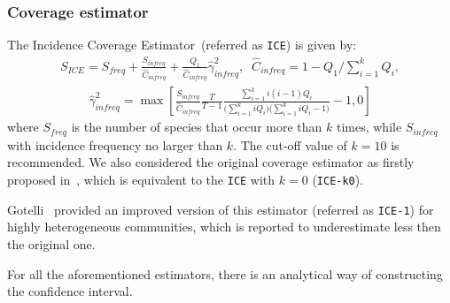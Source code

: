 \documentclass[sigconf,review,anonymous]{acmart}
\newcommand{\ICEallrare}{ICE-k0\xspace}
\newcounter{todocounter}
\newcommand{\todo}[1]{\marginpar{$|$}\textcolor{red}{\stepcounter{todocounter}\footnote[\thetodocounter]{\textcolor{red}{\textbf{TODO }}\textit{#1}}}}
\def\<#1>{\texttt{#1}}
\renewcommand{\todo}[1]{}
\begin{document}
\subsubsection{Coverage estimator~\cite{chao1992estimating}} %
The Incidence Coverage Estimator~(referred as \<ICE>) %
is given by:
\begin{gather*}
  S_{\textit{ICE}} = S_{\textit{freq}} + \frac{S_{\textit{infreq}}}{\hat{C}_{\textit{infreq}}}
  + \frac{Q_1}{\hat{C}_{\textit{infreq}}}\hat{\gamma}^2_{\textit{infreq}},\;\; \hat{C}_{\textit{infreq}}=1-Q_{1}/\sum_{i=1}^{k}Q_{i},
\end{gather*}
\begin{gather*}
  \hat{\gamma}_{\textit{infreq}}^2 = \max\left[\frac{S_{\textit{infreq}}}{\hat{C}_{\textit{infreq}}}\frac{T}{T-1}
  \frac{\sum_{i=1}^{k} i(i-1)Q_i}{
    \big(\sum_{i=1}^{k} iQ_i\big) \big(\sum_{i=1}^{k} iQ_i-1\big)
  } -1,0
  \right]
\end{gather*}
where $S_{\textit{freq}}$ is the number of species that occur more than $k$ times, %
while $S_{\textit{infreq}}$ with incidence frequency no larger than $k$.
The cut-off value of $k=10$ is recommended. We also considered the original coverage estimator
as firstly proposed in~\cite{lee1994estimating}, which is equivalent to the
\<ICE> with $k=0$ (\<\ICEallrare>).

Gotelli~\cite{gotelli2013measuring} provided an improved version of this estimator (referred as \<ICE-1>) for highly heterogeneous communities,
which is reported to underestimate less then the original one.


For all the aforementioned estimators, there is an analytical way of constructing the confidence interval.



\end{document}
